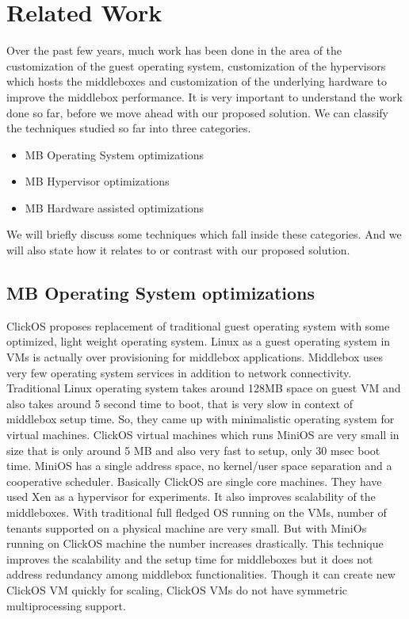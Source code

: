 \documentclass[a4paper,11pt]{report}
\begin{document}
\chapter{Related Work}
\noindent Over the past few years, much work has been done in the area of the customization of the guest operating system, customization of the hypervisors which hosts the middleboxes and customization of the underlying hardware to improve the middlebox performance. It is very important to understand the work done so far, before we move ahead with our proposed solution. We can classify the techniques studied so far into three categories.
\begin{itemize}
\item MB Operating System optimizations
\item MB Hypervisor optimizations
\item MB Hardware assisted optimizations
\end{itemize}
We will briefly discuss some techniques which fall inside these categories. And we will also state how it relates to or contrast with our proposed solution.
\section{MB Operating System optimizations}
ClickOS\cite{R1} proposes replacement of traditional guest operating system with some optimized, light weight operating system. Linux as a guest operating system in VMs is actually over provisioning for middlebox applications. Middlebox uses very few operating system services in addition to network connectivity. Traditional Linux operating system takes around 128MB space on guest VM and also takes around 5 second time to boot, that is very slow in context of middlebox setup time. So, they came up with minimalistic operating system for virtual machines. ClickOS virtual machines which runs MiniOS are very small in size that is only around 5 MB and also very fast to setup, only 30 msec boot time. MiniOS has a single address space, no kernel/user space separation and a cooperative scheduler. Basically ClickOS are single core machines. They have used Xen as a hypervisor for experiments. It also improves scalability of the middleboxes. With traditional full fledged OS running on the VMs, number of tenants supported on a physical machine are very small. But with MiniOs running on ClickOS machine the number increases drastically. This technique improves the scalability and the setup time for middleboxes but it does not address redundancy among middlebox functionalities. Though it can create new ClickOS VM quickly for scaling, ClickOS VMs do not have symmetric multiprocessing support.             
\end{document}
